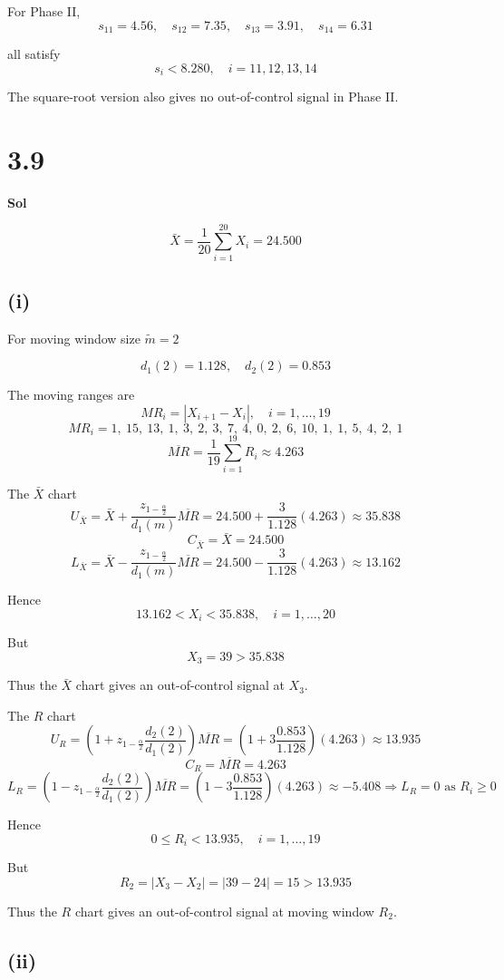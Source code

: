 \documentclass[a4paper, 12pt]{article}  %
\begin{document}
For Phase II,
$$
s_{11}=4.56,\quad
s_{12}=7.35,\quad
s_{13}=3.91,\quad
s_{14}=6.31
$$

all satisfy
$$
s_i<8.280,\quad i=11,12,13,14
$$

The square-root version also gives no out-of-control signal in Phase II.

\section*{3.9}
\textbf{Sol}

$$
\bar X=\frac{1}{20}\sum_{i=1}^{20}X_i=24.500
$$

\subsection*{(i)}

For moving window size $\tilde m=2$

$$
d_1(2)=1.128,\quad d_2(2)=0.853
$$

The moving ranges are
$$
MR_i=|X_{i+1}-X_i|,\quad i=1,\ldots,19
$$
$$
MR_i=1,\ 15,\ 13,\ 1,\ 3,\ 2,\ 3,\ 7,\ 4,\ 0,\ 2,\ 6,\ 10,\ 1,\ 1,\ 5,\ 4,\ 2,\ 1
$$
$$
\overline{MR}=\frac{1}{19}\sum_{i=1}^{19}R_i\approx 4.263
$$

The \(\bar X\) chart
$$
U_{\bar X}=\bar X+\frac{z_{1-\frac{\alpha}{2}}}{d_1(m)}\overline{MR}=24.500+\frac{3}{1.128}(4.263)\approx 35.838
$$
$$
C_{\bar X}=\bar X=24.500
$$
$$
L_{\bar X}=\bar X-\frac{z_{1-\frac{\alpha}{2}}}{d_1(m)}\overline{MR}=24.500-\frac{3}{1.128}(4.263)\approx 13.162
$$

Hence
$$
13.162<X_i<35.838,\quad i=1,\ldots,20
$$

But
$$
X_3=39>35.838
$$

Thus the \(\bar X\) chart gives an out-of-control signal at \(X_3\).

The \(R\) chart
$$
U_R=\left(1+z_{1-\frac{\alpha}{2}}\frac{d_2(2)}{d_1(2)}\right)\overline{MR}=\left(1+3\frac{0.853}{1.128}\right)(4.263)\approx 13.935
$$
$$
C_R=\overline{MR}=4.263
$$
$$
L_R=\left(1-z_{1-\frac{\alpha}{2}}\frac{d_2(2)}{d_1(2)}\right)\overline{MR}=\left(1-3\frac{0.853}{1.128}\right)(4.263)\approx -5.408\Rightarrow L_R=0 \text{ as } R_i\ge0
$$

Hence
$$
0\le R_i<13.935,\quad i=1,\ldots,19
$$

But
$$
R_2=|X_3-X_2|=|39-24|=15>13.935
$$

Thus the \(R\) chart gives an out-of-control signal at moving window \(R_2\).

\subsection*{(ii)}
\end{document}
